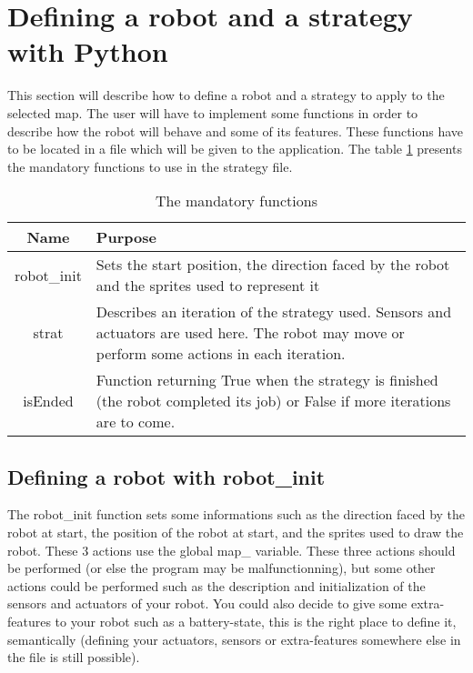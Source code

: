 \documentclass[a4paper,11pt]{article}
\begin{document}
\section{Defining a robot and a strategy with Python}

This section will describe how to define a robot and a strategy to
apply to the selected map. The user will have to implement some
functions in order to describe how the robot will behave and some of
its features. These functions have to be located in a file which will
be given to the application. The table \ref{tab:PyMandatoryFunc}
presents the mandatory functions to use in the strategy file.

\begin{table}[h]
  \begin{center}
    \begin{tabular}{|c|p{10cm}|}
      \hline
      Name & Purpose \\
      \hline
      robot\_init & Sets the start position, the direction faced by the
      robot and the sprites used to represent it \\
      \hline
      strat & Describes an iteration of the strategy used. Sensors and
      actuators are used here. The robot may move or perform some
      actions in each iteration. \\
      \hline
      isEnded & Function returning True when the strategy is finished
      (the robot completed its job) or False if more iterations are to
      come.\\ 
      \hline 
    \end{tabular}
    \caption{\label{tab:PyMandatoryFunc} The mandatory functions}
  \end{center}
\end{table}

\subsection{Defining a robot with robot\_init}

The robot\_init function sets some informations such as the direction
faced by the robot at start, the position of the robot at start, and
the sprites used to draw the robot. These 3 actions use the global
map\_ variable. These three actions should be performed (or else the
program may be malfunctionning), but some other actions could be
performed such as the description and initialization of the sensors
and actuators of your robot. You could also decide to give some
extra-features to your robot such as a battery-state, this is the
right place to define it, semantically (defining your actuators,
sensors or extra-features somewhere else in the file is still
possible).
\end{document}
